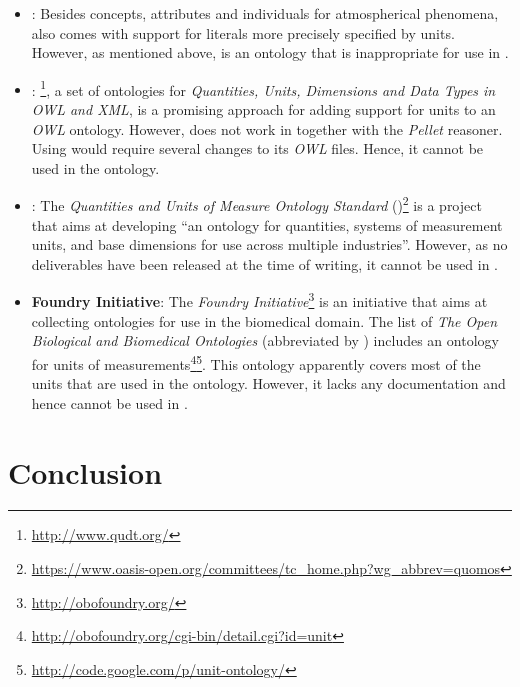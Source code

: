\begin{itemize}
  \item \textbf{}: Besides concepts, attributes and individuals for atmospherical phenomena,  also comes with support for literals more precisely specified by units. However, as mentioned above,  is an ontology that is inappropriate for use in \thinkhomeweather.
  
  \item \textbf{}: \footnote{\href{http://www.qudt.org/}{http://www.qudt.org/}}, a set of ontologies for \emph{Quantities, Units, Dimensions and Data Types in OWL and XML}, is a promising approach for adding support for units to an \emph{OWL} ontology. However,  does not work in \protege together with the \emph{Pellet} reasoner. Using  would require several changes to its \emph{OWL} files. Hence, it cannot be used in the \thinkhomeweather ontology.
  
  \item \textbf{}: The \emph{ Quantities and Units of Measure Ontology Standard} ()\footnote{\href{https://www.oasis-open.org/committees/tc\_home.php?wg\_abbrev=quomos}{https://www.oasis-open.org/committees/tc\_home.php?wg\_abbrev=quomos}} is a project that aims at developing ``an ontology for quantities, systems of measurement units, and base dimensions for use across multiple industries''. However, as no deliverables have been released at the time of writing, it cannot be used in \thinkhomeweather.
  
  \item \textbf{ Foundry Initiative}: The \emph{ Foundry Initiative}\footnote{\href{http://obofoundry.org/}{http://obofoundry.org/}} is an initiative that aims at collecting ontologies for use in the biomedical domain. The list of \emph{The Open Biological and Biomedical Ontologies} (abbreviated by ) includes an ontology for units of measurements\footnote{\href{http://obofoundry.org/cgi-bin/detail.cgi?id=unit}{http://obofoundry.org/cgi-bin/detail.cgi?id=unit}}\footnote{\href{http://code.google.com/p/unit-ontology/}{http://code.google.com/p/unit-ontology/}}. This ontology apparently covers most of the units that are used in the \thinkhomeweather ontology. However, it lacks any documentation and hence cannot be used in \thinkhomeweather.
\end{itemize}

\section{Conclusion}

